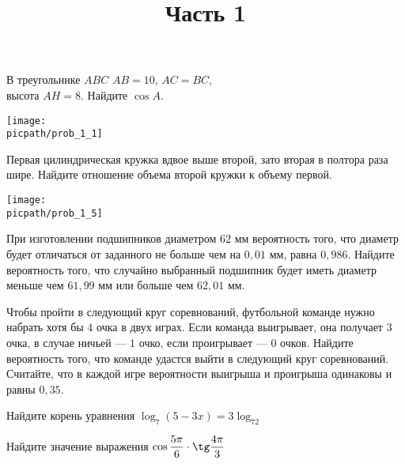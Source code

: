 %
%

\begin{training}[1]
	\title{Часть 1}
	\egepreambone
	\begin{listofex}
		\item
		\begin{minipage}[t]{\bodywidth}
			В треугольнике \( ABC \) \( AB=10 \), \( AC=BC \),\\
			высота \( AH=8 \). Найдите \( \cos A \).
			\foranswer
		\end{minipage}
		\gapwidth
		\begin{minipage}[t]{\picwidth}
			\texttt{[image: \\picpath/prob\_1\_1]}
		\end{minipage}
		\item
		\begin{minipage}[t]{\bodywidth}
			Первая цилиндрическая кружка вдвое
			выше второй, зато вторая в полтора раза
			шире. Найдите отношение объема второй
			кружки к объему первой.
			\foranswer
		\end{minipage}
		\gapwidth
		\begin{minipage}[t]{\picwidth}
			\texttt{[image: \\picpath/prob\_1\_5]}
		\end{minipage}
		\item При изготовлении подшипников диаметром \( 62 \) мм
		вероятность того, что диаметр будет отличаться от заданного
		не больше чем на \( 0, 01 \) мм, равна \( 0, 986 \).
		Найдите вероятность того, что случайно выбранный подшипник
		будет иметь диаметр меньше чем \( 61, 99 \) мм
		или больше чем \( 62, 01 \) мм.
		\foranswer
		\item Чтобы пройти в следующий круг соревнований,
		футбольной команде нужно набрать хотя бы \( 4 \) очка в двух играх.
		Если команда выигрывает, она получает \( 3 \) очка,
		в случае ничьей --- \( 1 \) очко, если проигрывает --- \( 0 \) очков.
		Найдите вероятность того, что команде удастся выйти в следующий круг соревнований.
		Считайте, что в каждой игре вероятности выигрыша и
		проигрыша одинаковы и равны \( 0,35 \).
		\item Найдите корень уравнения \( \log_7(5-3x)=3\log_72 \)
		\foranswer
	\end{listofex}
	\newpage
	\phantom{Часть 1}
	\begin{listofex}[resume]
		\item Найдите значение выражения \( \cos\dfrac{5\pi}{6}\cdot\tg\dfrac{4\pi}{3} \)

\end{listofex}
\end{training}
